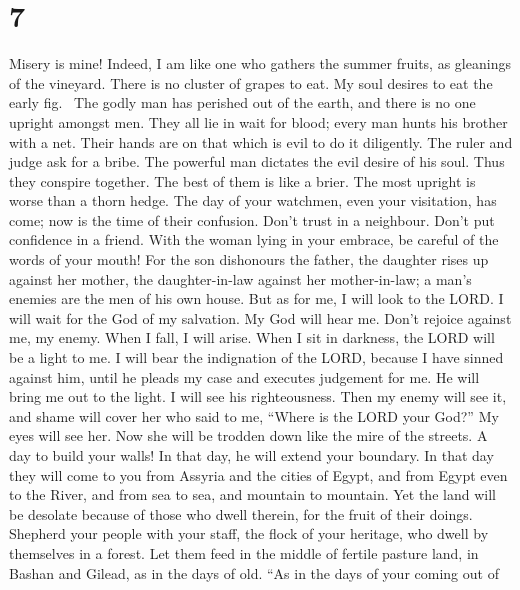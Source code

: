 \hypertarget{section-5}{%
\section{7}\label{section-5}}

 Misery is mine! Indeed, I am like one who gathers the
summer fruits, as gleanings of the vineyard. There is no cluster of
grapes to eat. My soul desires to eat the early fig.~ The
godly man has perished out of the earth, and there is no one upright
amongst men. They all lie in wait for blood; every man hunts his brother
with a net.  Their hands are on that which is evil to do
it diligently. The ruler and judge ask for a bribe. The powerful man
dictates the evil desire of his soul. Thus they conspire together.
 The best of them is like a brier. The most upright is
worse than a thorn hedge. The day of your watchmen, even your
visitation, has come; now is the time of their confusion. 
Don't trust in a neighbour. Don't put confidence in a friend. With the
woman lying in your embrace, be careful of the words of your mouth!
 For the son dishonours the father, the daughter rises up
against her mother, the daughter-in-law against her mother-in-law; a
man's enemies are the men of his own house.  But as for
me, I will look to the LORD. I will wait for the God of my salvation. My
God will hear me.  Don't rejoice against me, my enemy.
When I fall, I will arise. When I sit in darkness, the LORD will be a
light to me.  I will bear the indignation of the LORD,
because I have sinned against him, until he pleads my case and executes
judgement for me. He will bring me out to the light. I will see his
righteousness.  Then my enemy will see it, and shame will
cover her who said to me, ``Where is the LORD your God?'' My eyes will
see her. Now she will be trodden down like the mire of the streets.
 A day to build your walls! In that day, he will extend
your boundary.  In that day they will come to you from
Assyria and the cities of Egypt, and from Egypt even to the River, and
from sea to sea, and mountain to mountain.  Yet the land
will be desolate because of those who dwell therein, for the fruit of
their doings.  Shepherd your people with your staff, the
flock of your heritage, who dwell by themselves in a forest. Let them
feed in the middle of fertile pasture land, in Bashan and Gilead, as in
the days of old.  ``As in the days of your coming out of
